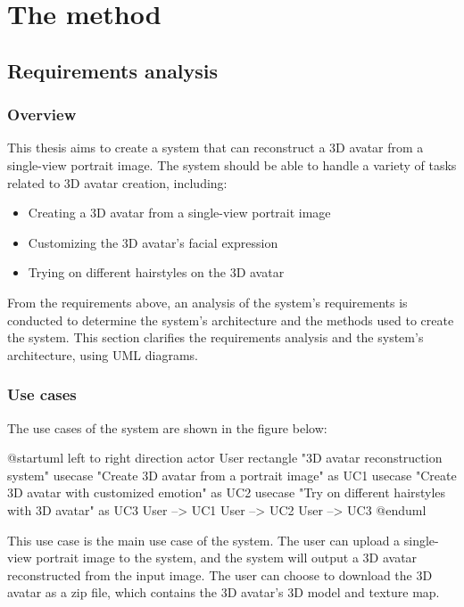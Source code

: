 \section{The method}
\label{sec:method}

\subsection{Requirements analysis}
\subsubsection{Overview}
This thesis aims to create a system that can reconstruct a 3D avatar from a single-view portrait image. The system should be able to handle a variety of tasks related to 3D avatar creation, including:
\begin{itemize}
    \item Creating a 3D avatar from a single-view portrait image

    \item Customizing the 3D avatar's facial expression

    \item Trying on different hairstyles on the 3D avatar
\end{itemize}

From the requirements above, an analysis of the system's requirements is conducted to determine the system's architecture and the methods used to create the system. This section clarifies the requirements analysis and the system's architecture, using UML diagrams.

\subsubsection{Use cases}
The use cases of the system are shown in the figure below:
\clearpage

\begin{umlfigure}
    @startuml
    left to right direction
    actor User
    rectangle "3D avatar reconstruction system" {
    usecase "Create 3D avatar from a portrait image" as UC1
    usecase "Create 3D avatar with customized emotion" as UC2
    usecase "Try on different hairstyles with 3D avatar" as UC3
    }
    User --> UC1
    User --> UC2
    User --> UC3
    @enduml
\end{umlfigure}

This use case is the main use case of the system. The user can upload a single-view portrait image to the system, and the system will output a 3D avatar reconstructed from the input image. The user can choose to download the 3D avatar as a zip file, which contains the 3D avatar's 3D model and texture map.

